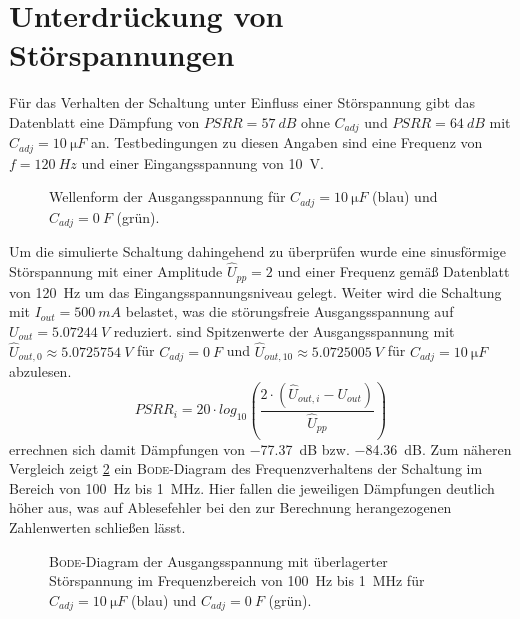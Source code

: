 	\section{Unterdrückung von Störspannungen}\label{sec:stoerspannungen}
		Für das Verhalten der Schaltung unter Einfluss einer Störspannung gibt das Datenblatt eine Dämpfung von \(PSRR = \SI{57}{dB}\) ohne
		\(C_{adj}\) und \(PSRR = \SI{64}{dB}\) mit \(C_{adj} = \SI{10}{\micro F}\) an. Testbedingungen zu diesen Angaben sind eine
		Frequenz von \(f = \SI{120}{Hz}\) und einer Eingangsspannung von \SI{10}{V}.\par
		\begin{figure}[h]
			\centering
			
			\caption[Wellenform der Ausgangsspannung mit Störspannung]{Wellenform der Ausgangsspannung für \(C_{adj} = \SI{10}{\micro F}\) (blau) und \(C_{adj} = \SI{0}{F}\) (grün).}
			\label{fig:ripple rejection}
		\end{figure}
		Um die simulierte Schaltung dahingehend zu überprüfen wurde eine sinusförmige Störspannung mit einer Amplitude \(\hat{U}_{pp} = 2\) und einer Frequenz gemäß
		Datenblatt von \SI{120}{Hz} um das Eingangsspannungsniveau gelegt. Weiter wird die Schaltung mit \(I_{out} = \SI{500}{mA}\) belastet, was die störungsfreie Ausgangsspannung
		auf \(U_{out} = \SI{5,07244}{V}\) reduziert.  sind Spitzenwerte der Ausgangsspannung mit
		\(\hat{U}_{out,0} \approx \SI{5,0725754}{V}\) für \(C_{adj} = \SI{0}{F}\) und \(\hat{U}_{out,10} \approx \SI{5,0725005}{V}\) für \(C_{adj} = \SI{10}{\micro F}\) abzulesen.
		\begin{equation}
			PSRR_i = 20 \cdot log_{10}\left(\frac{2 \cdot \left(\hat{U}_{out,i} - U_{out}\right)}{\hat{U}_{pp}}\right)
		\end{equation}
		errechnen sich damit Dämpfungen von \SI{-77,37}{dB} bzw. \SI{-84,36}{dB}. Zum näheren Vergleich zeigt \cref{fig:bode} ein \textsc{Bode}-Diagram des
		Frequenzverhaltens der Schaltung im Bereich von \SI{100}{Hz} bis \SI{1}{MHz}. Hier fallen die jeweiligen Dämpfungen deutlich höher aus, was auf Ablesefehler
		bei den zur Berechnung herangezogenen Zahlenwerten schließen lässt.
		\begin{figure}[H]
			\centering
			
			\caption[\textsc{Bode}-Diagram der Ausgangsspannung mit überlagerter Störspannung]{\textsc{Bode}-Diagram der Ausgangsspannung mit überlagerter Störspannung im Frequenzbereich
			von \SI{100}{Hz} bis \SI{1}{MHz} für \(C_{adj} = \SI{10}{\micro F}\) (blau) und \(C_{adj} = \SI{0}{F}\) (grün).}
			\label{fig:bode}
		\end{figure}
	\newpage
